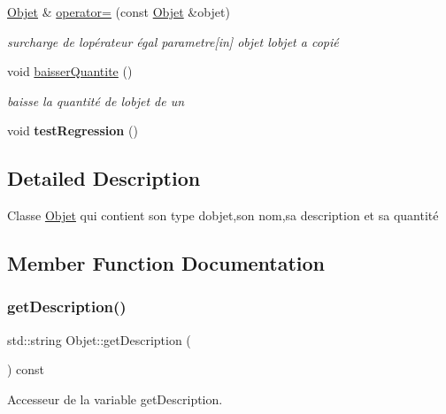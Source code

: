\begin{DoxyCompactItemize}
\hyperlink{class_objet}{Objet} \& \hyperlink{class_objet_a9e4b0fb73f3a95425f0239c91c7513f4}{operator=} (const \hyperlink{class_objet}{Objet} \&objet)
\begin{DoxyCompactList}\small\item\em surcharge de l\textquotesingle{}opérateur égal parametre\mbox{[}in\mbox{]} objet l\textquotesingle{}objet a copié \end{DoxyCompactList}\item 
\mbox{\label{class_objet_aa39f9e7546969cc0a53a2412deb4d27a}} 
void \hyperlink{class_objet_aa39f9e7546969cc0a53a2412deb4d27a}{baisser\+Quantite} ()
\begin{DoxyCompactList}\small\item\em baisse la quantité de l\textquotesingle{}objet de un \end{DoxyCompactList}\item 
\mbox{\label{class_objet_a1e7b9c9e5cc9417b182258bcb7a0ae21}} 
void {\bfseries test\+Regression} ()
\end{DoxyCompactItemize}


\subsection{Detailed Description}
Classe \hyperlink{class_objet}{Objet} qui contient son type d\textquotesingle{}objet,son nom,sa description et sa quantité 

\subsection{Member Function Documentation}
\mbox{\label{class_objet_aabd73e4b97e5fb14da9a2e4cf7899f97}} 
\subsubsection{\texorpdfstring{get\+Description()}{getDescription()}}
{\footnotesize\ttfamily std\+::string Objet\+::get\+Description (\begin{DoxyParamCaption}{ }\end{DoxyParamCaption}) const}



Accesseur de la variable get\+Description. 

